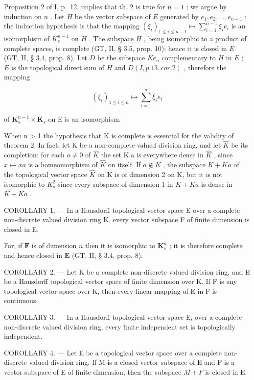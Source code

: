 Proposition 2 of I, p.~12, implies that th. 2 is true for \(n = 1\) ; we argue by induction on \(n\) . Let \(H\) be the vector subspace of \(E\) generated by \(e_1, e_2, ..., e_{n-1}\) ; the induction hypothesis is that the mapping \((\xi_i)_{1 \leqslant i \leqslant n-1} \mapsto \sum_{i=1}^{n-1} \xi_i e_i\) is an isomorphism of \(K_s^{n-1}\) on \(H\) . The subspace \(H\) , being isomorphic to a product of complete spaces, is complete (GT, II, § 3.5, prop. 10); hence it is closed in \(E\) (GT, II, § 3.4, prop. 8). Let \(D\) be the subspace \(K e_n\) complementary to \(H\) in \(E\) ; \(E\) is the topological direct sum of \(H\) and \(D(I, p. 13, cor. 2)\) , therefore the mapping

\[
\left(\xi_ {i}\right) _ {1 \leqslant i \leqslant n} \mapsto \sum_ {i = 1} ^ {n} \xi_ {i} e _ {i}
\]

of \(\mathbf{K}_s^{n - 1}\times \mathbf{K}_s\) on E is an isomorphism.

When n \textgreater{} 1 the hypothesis that K is complete is essential for the validity of theorem 2. In fact, let K be a non-complete valued division ring, and let \(\hat{K}\) be its completion: for each \(a \neq 0\) of \(\hat{K}\) the set K.a is everywhere dense in \(\hat{K}\) , since \(x \mapsto xa\) is a homeomorphism of \(\hat{K}\) on itself. If \(a \notin K\) , the subspace \(K + Ka\) of the topological vector space \(\hat{K}\) on K is of dimension 2 on K, but it is not isomorphic to \(K_{s}^{2}\) since every subspace of dimension 1 in \(K + Ka\) is dense in \(K + Ka\) .

COROLLARY 1. --- In a Hausdorff topological vector space E over a complete non-discrete valued division ring K, every vector subspace F of finite dimension is closed in E.

For, if \(\mathbf{F}\) is of dimension \(n\) then it is isomorphic to \(\mathbf{K}_s^n\) ; it is therefore complete and hence closed in \(\mathbf{E}\) (GT, II, § 3.4, prop. 8).

COROLLARY 2. --- Let K be a complete non-discrete valued division ring, and E be a Hausdorff topological vector space of finite dimension over K. If F is any topological vector space over K, then every linear mapping of E in F is continuous.

COROLLARY 3. --- In a Hausdorff topological vector space E, over a complete non-discrete valued division ring, every finite independent set is topologically independent.

COROLLARY 4. --- Let E be a topological vector space over a complete non-discrete valued division ring. If M is a closed vector subspace of E and F is a vector subspace of E of finite dimension, then the subspace \(M + F\) is closed in E.


